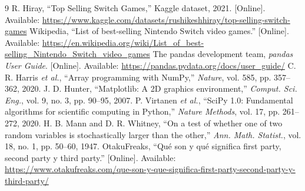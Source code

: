 \documentclass[conference]{IEEEtran}
\begin{document}
\begin{thebibliography}{9}
 R. Hiray, ``Top Selling Switch Games,'' Kaggle dataset, 2021. [Online]. Available: \url{https://www.kaggle.com/datasets/rushikeshhiray/top-selling-switch-games}
 Wikipedia, ``List of best-selling Nintendo Switch video games.'' [Online]. Available: \url{https://en.wikipedia.org/wiki/List_of_best-selling_Nintendo_Switch_video_games}
 The pandas development team, \emph{pandas User Guide}. [Online]. Available: \url{https://pandas.pydata.org/docs/user_guide/}
 C. R. Harris \emph{et al.}, ``Array programming with NumPy,'' \emph{Nature}, vol. 585, pp. 357--362, 2020.
 J. D. Hunter, ``Matplotlib: A 2D graphics environment,'' \emph{Comput. Sci. Eng.}, vol. 9, no. 3, pp. 90--95, 2007.
 P. Virtanen \emph{et al.}, ``SciPy 1.0: Fundamental algorithms for scientific computing in Python,'' \emph{Nature Methods}, vol. 17, pp. 261--272, 2020.
 H. B. Mann and D. R. Whitney, ``On a test of whether one of two random variables is stochastically larger than the other,'' \emph{Ann. Math. Statist.}, vol. 18, no. 1, pp. 50--60, 1947.
 OtakuFreaks, ``Qué son y qué significa first party, second party y third party.'' [Online]. Available: \url{https://www.otakufreaks.com/que-son-y-que-significa-first-party-second-party-y-third-party/}
\end{thebibliography}
\end{document}
